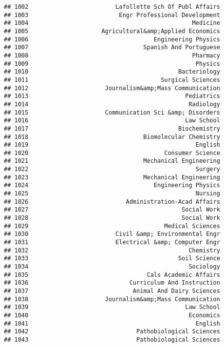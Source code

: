 \documentclass[
]{article}
\begin{document}
\begin{verbatim}
## 1002                         Lafollette Sch Of Publ Affairs
## 1003                          Engr Professional Development
## 1004                                               Medicine
## 1005                     Agricultural&amp;Applied Economics
## 1006                                    Engineering Physics
## 1007                                 Spanish And Portuguese
## 1008                                               Pharmacy
## 1009                                                Physics
## 1010                                           Bacteriology
## 1011                                      Surgical Sciences
## 1012                      Journalism&amp;Mass Communication
## 1013                                             Pediatrics
## 1014                                              Radiology
## 1015                      Communication Sci &amp; Disorders
## 1016                                             Law School
## 1017                                           Biochemistry
## 1018                                 Biomolecular Chemistry
## 1019                                                English
## 1020                                       Consumer Science
## 1021                                 Mechanical Engineering
## 1022                                                Surgery
## 1023                                 Mechanical Engineering
## 1024                                    Engineering Physics
## 1025                                                Nursing
## 1026                            Administration-Acad Affairs
## 1027                                            Social Work
## 1028                                            Social Work
## 1029                                       Medical Sciences
## 1030                         Civil &amp; Environmental Engr
## 1031                         Electrical &amp; Computer Engr
## 1032                                              Chemistry
## 1033                                           Soil Science
## 1034                                              Sociology
## 1035                                  Cals Academic Affairs
## 1036                             Curriculum And Instruction
## 1037                              Animal And Dairy Sciences
## 1038                      Journalism&amp;Mass Communication
## 1039                                             Law School
## 1040                                              Economics
## 1041                                                English
## 1042                               Pathobiological Sciences
## 1043                               Pathobiological Sciences

\end{verbatim}
\end{document}
